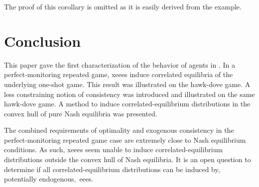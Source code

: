 The proof of this corollary is omitted as it is easily derived from the example.

\section{Conclusion}
This paper gave the first characterization of the behavior of agents in .
In a perfect-monitoring repeated game, \acp{xeee} induce correlated equilibria of the underlying one-shot game.
This result was illustrated on the hawk-dove game.
A less constraining notion of consistency was introduced and illustrated on the same hawk-dove game.
A method to induce correlated-equilibrium distributions in the convex hull of pure Nash equilibria was presented.

The combined requirements of optimality and exogenous consistency in the perfect-monitoring repeated game case are extremely close to Nash equilibrium conditions.
As such, \acp{xeee} seem unable to induce correlated-equilibrium distributions outside the convex hull of Nash equilibria.
It is an open question to determine if all correlated-equilibrium distributions can be induced by, potentially endogenous,~\acp{eee}.
